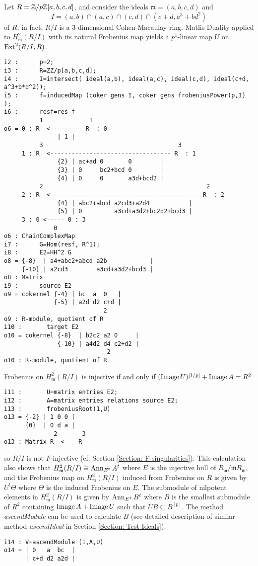 \documentclass[11pt]{amsart}
\begin{document}
\begin{example}
Let $R=\mbox{$\mathbb{Z}$}/p\mbox{$\mathbb{Z}$}[a,b,c,d]$, and consider the ideals $\mathfrak{m}=(a,b,c,d)$ and
$$I= (a,b) \cap (a,c) \cap (c,d) \cap (c+d, a^3+b d^2)$$
of $R$; in fact, $R/I$ is a $3$-dimensional Cohen-Macaulay ring.
Matlis Duality applied to $H^2_{\mathfrak{m}} (R/I)$ with its natural Frobenius map
yields a $p^1$-linear map $U$ on $\operatorname{Ext}^2(R/ I, R)$.

\begin{verbatim}
i2 :      p=2;
i3 :      R=ZZ/p[a,b,c,d];
i4 :      I=intersect( ideal(a,b), ideal(a,c), ideal(c,d), ideal(c+d, a^3+b*d^2));
i5 :      f=inducedMap (coker gens I, coker gens frobeniusPower(p,I) );
i6 :      resf=res f
          1             1
o6 = 0 : R  <--------- R  : 0
               | 1 |
          3                                      3
     1 : R  <---------------------------------- R  : 1
               {2} | ac+ad 0       0        |
               {3} | 0     bc2+bcd 0        |
               {4} | 0     0       a3d+bcd2 |
          2                                              2
     2 : R  <------------------------------------------ R  : 2
               {4} | abc2+abcd a2cd3+a2d4           |
               {5} | 0         a3cd+a3d2+bc2d2+bcd3 |
     3 : 0 <----- 0 : 3
              0
o6 : ChainComplexMap
i7 :      G=Hom(resf, R^1);
i8 :      E2=HH^2 G
o8 = {-8}  | a4+abc2+abcd a2b            |
     {-10} | a2cd3        a3cd+a3d2+bcd3 |
o8 : Matrix
i9 :      source E2
o9 = cokernel {-4} | bc  a  0   |
              {-5} | a2d d2 c+d |
                            2
o9 : R-module, quotient of R
i10 :       target E2
o10 = cokernel {-8}  | b2c2 a2 0     |
               {-10} | a4d2 d4 c2+d2 |
                             2
o10 : R-module, quotient of R
\end{verbatim}
Frobenius on $H^2_{\mathfrak{m}} (R/I)$ is injective if and only if
$(\operatorname{Image} U)^{[1/p]}+\operatorname{Image} A=R^2$
\begin{verbatim}
i11 :       U=matrix entries E2;
i12 :       A=matrix entries relations source E2;
i13 :       frobeniusRoot(1,U)
o13 = {-2} | 1 0 0 |
      {0}  | 0 d a |
              2       3
o13 : Matrix R  <--- R
\end{verbatim}
so $R/I$ is not $F$-injective (cf. Section \ref{Section: F-singularities}).
This calculation also shows that $H^2_{\mathfrak{m}} (R/I)\cong \operatorname{{Ann}}_{E^2} A^t$
where $E$ is the injective hull of $R_{\mathfrak{m}}/ {\mathfrak{m}} R_{\mathfrak{m}}$,
and the Frobenius map on  $H^2_{\mathfrak{m}} (R/I)$ induced from Frobenius on $R$
is given by $U^t \Theta$ where $\Theta$ is the induced Frobenius on $E$.
The submodule of nilpotent elements in  $H^2_{\mathfrak{m}} (R/I)$ is
given by $\operatorname{{Ann}}_{E^2} B^t$ where $B$ is the smallest submodule of $R^2$ containing $\operatorname{Image} A + \operatorname{Image} U$ such that $U  B \subseteq B^{[p]}$.
The method \emph{ascendModule} can be used to calculate  $B$ (see detailed description of similar method \emph{ascendIdeal} in Section \ref{Section: Test Ideals}).
\begin{verbatim}
i14 : V=ascendModule (1,A,U)
o14 = | 0   a  bc  |
      | c+d d2 a2d |
\end{verbatim}


\end{example}
\end{document}
